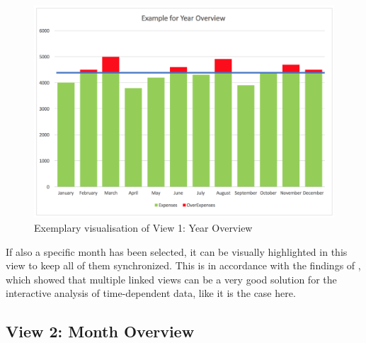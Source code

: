 \begin{figure}[h]
	\begin{center}
		\includegraphics[width=14cm]{03_Figures/07_Suggestion/View1_YearOverview.png}
		\caption{Exemplary visualisation of View 1: Year Overview}
		\label{fig:view1chart}
	\end{center}
\end{figure}
If also a specific month has been selected, it can be visually highlighted in this view to keep all of them synchronized. This is in accordance with the findings of \cite{Hentschel2009}, which showed that multiple linked views can be a very good solution for the interactive analysis of time-dependent data, like it is the case here.



\subsection{View 2: Month Overview}

